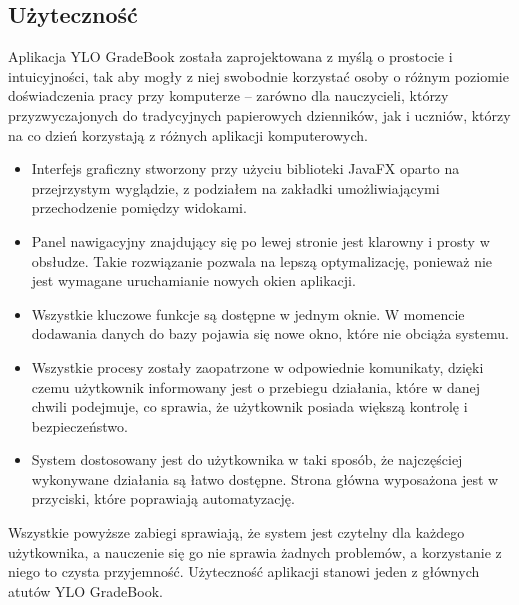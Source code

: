 \subsection{Użyteczność}
\label{użyteczność}
Aplikacja YLO GradeBook została zaprojektowana z myślą o prostocie i intuicyjności, tak aby mogły z niej swobodnie korzystać osoby o różnym poziomie doświadczenia pracy przy komputerze – zarówno dla nauczycieli, którzy przyzwyczajonych do tradycyjnych papierowych dzienników, jak i uczniów, którzy na co dzień korzystają z różnych aplikacji komputerowych.
\begin{itemize}
      \item Interfejs graficzny stworzony przy użyciu biblioteki JavaFX oparto na przejrzystym wyglądzie, z podziałem na zakładki umożliwiającymi przechodzenie pomiędzy widokami. 
      \item Panel nawigacyjny znajdujący się po lewej stronie jest klarowny i prosty w obsłudze. Takie rozwiązanie pozwala na lepszą optymalizację, ponieważ nie jest wymagane uruchamianie nowych okien aplikacji.
      \item Wszystkie kluczowe funkcje są dostępne w jednym oknie. W momencie dodawania danych do bazy pojawia się nowe okno, które nie obciąża systemu.
      \item Wszystkie procesy zostały zaopatrzone w odpowiednie komunikaty, dzięki czemu użytkownik informowany jest o przebiegu działania, które w danej chwili podejmuje, co sprawia, że użytkownik posiada większą kontrolę i bezpieczeństwo.
      \item System dostosowany jest do użytkownika w taki sposób, że najczęściej wykonywane działania są łatwo dostępne. Strona główna wyposażona jest w przyciski, które poprawiają automatyzację.
\end{itemize}
Wszystkie powyższe zabiegi sprawiają, że system jest czytelny dla każdego użytkownika, a nauczenie się go nie sprawia żadnych problemów, a korzystanie z niego to czysta przyjemność. Użyteczność aplikacji stanowi jeden z głównych atutów YLO GradeBook.

